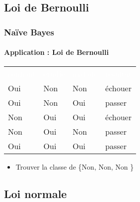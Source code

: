 \documentclass[xcolor=table]{beamer}
\begin{document}
\subsection{Loi de Bernoulli}

\begin{frame}
	\frametitle{Naïve Bayes}
	\framesubtitle{Application : Loi de Bernoulli}
	
	\scriptsize
	\begin{center}
		\begin{tabular}{llll}
			\rowcolor{darkblue}
			\textcolor{white}{confiant} & \textcolor{white}{étudié} & \textcolor{white}{malade} & \textcolor{white}{résultat} \\
			Oui & Non & Non & échouer \\
			Oui & Non & Oui & passer \\
			Non & Oui & Oui & échouer \\
			Non & Oui & Non & passer \\
			Oui & Oui & Oui & passer \\
		\end{tabular}
	\end{center}
	
	\begin{itemize}
		\item Trouver la classe de \{Non, Non, Non \}
	\end{itemize}
	
	
\end{frame}


\subsection{Loi normale}
\end{document}
